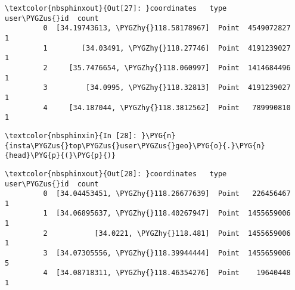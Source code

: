 \documentclass[letterpaper,10pt,english]{sphinxmanual}
\begin{document}
%
\begin{Verbatim}[commandchars=\\\{\}]
\textcolor{nbsphinxout}{Out[27]: }coordinates   type     user\PYGZus{}id  count
         0  [34.19743613, \PYGZhy{}118.58178967]  Point  4549072827      1
         1        [34.03491, \PYGZhy{}118.27746]  Point  4191239027      1
         2     [35.7476654, \PYGZhy{}118.060997]  Point  1414684496      1
         3         [34.0995, \PYGZhy{}118.32813]  Point  4191239027      1
         4     [34.187044, \PYGZhy{}118.3812562]  Point   789990810      1
\end{Verbatim}

%
\begin{Verbatim}[commandchars=\\\{\}]
\textcolor{nbsphinxin}{In [28]: }\PYG{n}{insta\PYGZus{}top\PYGZus{}user\PYGZus{}geo}\PYG{o}{.}\PYG{n}{head}\PYG{p}{(}\PYG{p}{)}
\end{Verbatim}

%
\begin{Verbatim}[commandchars=\\\{\}]
\textcolor{nbsphinxout}{Out[28]: }coordinates   type     user\PYGZus{}id  count
         0  [34.04453451, \PYGZhy{}118.26677639]  Point   226456467      1
         1  [34.06895637, \PYGZhy{}118.40267947]  Point  1455659006      1
         2           [34.0221, \PYGZhy{}118.481]  Point  1455659006      1
         3  [34.07305556, \PYGZhy{}118.39944444]  Point  1455659006      5
         4  [34.08718311, \PYGZhy{}118.46354276]  Point    19640448      1
\end{Verbatim}
\end{document}
